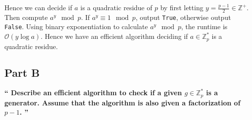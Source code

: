 \documentclass{article}
\newcommand{\HomeworkText}[1]{\textbf{``#1''}\\}
\begin{document}
	Hence we can decide if $a$ is a quadratic residue of $p$ by first letting $y = \frac{p-1}{2} \in \mathbb{Z}^{+}$. Then compute $a^y \mod p$. If $a^y \equiv 1 \mod p$, output \texttt{True}, otherwise output \texttt{False}. Using binary exponentiation to calculate $a^y \mod p$, the runtime is $\mathcal{O}(y\log a)$. Hence we have an efficient algorithm deciding if $a \in \mathbb{Z}_p^*$ is a quadratic residue.


	\subsection*{Part B}
	\HomeworkText{
		Describe an efficient algorithm to check if a given $g \in \mathbb{Z}^{*}_{p}$ is a generator. Assume that the algorithm is also given a factorization of $p - 1$.
	}
\end{document}
